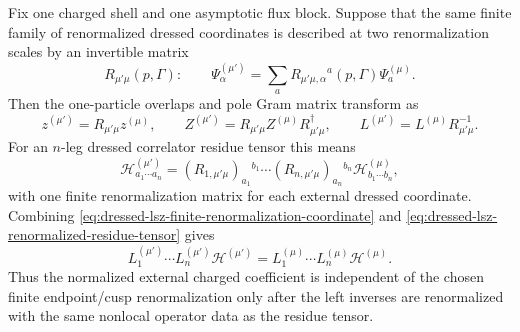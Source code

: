 Fix one charged shell and one asymptotic flux block.  Suppose that the same
finite family of renormalized dressed coordinates is described at two
renormalization scales by an invertible matrix
\[
  R_{\mu'\mu}(p,\Gamma):
  \qquad
  \Psi_{\alpha}^{(\mu')}
  =
  \sum_a
  R_{\mu'\mu,\alpha}{}^{a}(p,\Gamma)\Psi_a^{(\mu)} .
\]
Then the one-particle overlaps and pole Gram matrix transform as
\begin{equation}
  z^{(\mu')}=R_{\mu'\mu}z^{(\mu)},
  \qquad
  Z^{(\mu')}=R_{\mu'\mu}Z^{(\mu)}R_{\mu'\mu}^{\dagger},
  \qquad
  L^{(\mu')}=L^{(\mu)}R_{\mu'\mu}^{-1}.
  \label{eq:dressed-lsz-finite-renormalization-coordinate}
\end{equation}
For an \(n\)-leg dressed correlator residue tensor this means
\begin{equation}
  \mathcal H_{a_1\cdots a_n}^{(\mu')}
  =
  (R_{1,\mu'\mu})_{a_1}{}^{b_1}\cdots
  (R_{n,\mu'\mu})_{a_n}{}^{b_n}
  \mathcal H_{b_1\cdots b_n}^{(\mu)} ,
  \label{eq:dressed-lsz-renormalized-residue-tensor}
\end{equation}
with one finite renormalization matrix for each external dressed coordinate.
Combining \eqref{eq:dressed-lsz-finite-renormalization-coordinate} and
\eqref{eq:dressed-lsz-renormalized-residue-tensor} gives
\[
  L_1^{(\mu')}\cdots L_n^{(\mu')}
  \mathcal H^{(\mu')}
  =
  L_1^{(\mu)}\cdots L_n^{(\mu)}
  \mathcal H^{(\mu)} .
\]
Thus the normalized external charged coefficient is independent of the
chosen finite endpoint/cusp renormalization only after the left inverses are
renormalized with the same nonlocal operator data as the residue tensor.

